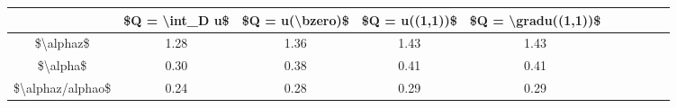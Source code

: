 \begin{tabular}{Sc Sc Sc Sc Sc}
\toprule
{} & \$Q = \textbackslash int\_D u\$ & \$Q = u(\textbackslash bzero)\$ & \$Q = u((1,1))\$ & \$Q = \textbackslash gradu((1,1))\$ \\
\midrule
\$\textbackslash alphaz\$        &           1.28 &            1.36 &           1.43 &                1.43 \\
\$\textbackslash alpha\$         &           0.30 &            0.38 &           0.41 &                0.41 \\
\$\textbackslash alphaz/alphao\$ &           0.24 &            0.28 &           0.29 &                0.29 \\
\bottomrule
\end{tabular}
